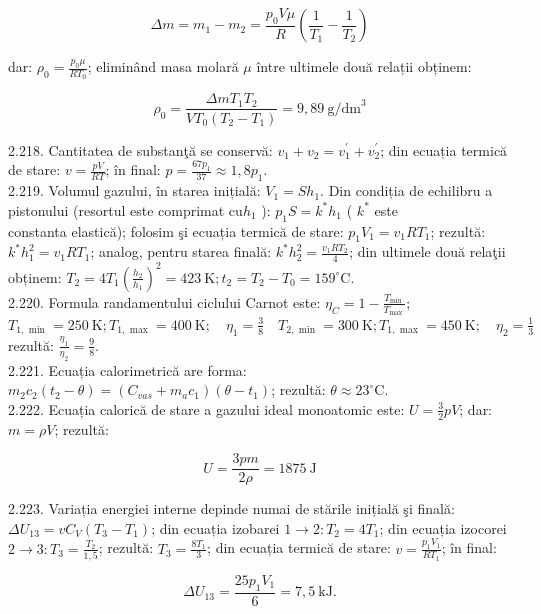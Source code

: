 \documentclass[10pt]{article}
\begin{document}
$$
\Delta m=m_{1}-m_{2}=\frac{p_{0} V \mu}{R}\left(\frac{1}{T_{1}}-\frac{1}{T_{2}}\right)
$$

dar: $\rho_{0}=\frac{p_{0} \mu}{R T_{0}}$; eliminând masa molară $\mu$ între ultimele două relații obținem:

$$
\rho_{0}=\frac{\Delta m T_{1} T_{2}}{V T_{0}\left(T_{2}-T_{1}\right)}=9,89 \mathrm{~g} / \mathrm{dm}^{3}
$$

2.218. Cantitatea de substanţă se conservă: $v_{1}+v_{2}=v_{1}^{\prime}+v_{2}^{\prime}$; din ecuația termică de stare: $v=\frac{p V}{R T}$; în final: $p=\frac{67 p_{1}}{37} \approx 1,8 p_{1}$.\\
2.219. Volumul gazului, în starea inițială: $V_{1}=S h_{1}$. Din condiția de echilibru a pistonului (resortul este comprimat $\mathrm{cu} h_{1}$ ): $p_{1} S=k^{*} h_{1}$ ( $k^{*}$ este\\
constanta elastică); folosim şi ecuația termică de stare: $p_{1} V_{1}=v_{1} R T_{1}$; rezultă: $k^{*} h_{1}^{2}=v_{1} R T_{1}$; analog, pentru starea finală: $k^{*} h_{2}^{2}=\frac{v_{1} R T_{2}}{4}$; din ultimele două relaţii obținem: $T_{2}=4 T_{1}\left(\frac{h_{2}}{h_{1}}\right)^{2}=423 \mathrm{~K} ; t_{2}=T_{2}-T_{0}=159^{\circ} \mathrm{C}$.\\
2.220. Formula randamentului ciclului Carnot este: $\eta_{C}=1-\frac{T_{\text {min }}}{T_{\text {max }}}$; $T_{1, \text { min }}=250 \mathrm{~K} ; T_{1, \text { max }}=400 \mathrm{~K} ; \quad \eta_{1}=\frac{3}{8} \quad T_{2, \text { min }}=300 \mathrm{~K} ; T_{1, \text { max }}=450 \mathrm{~K} ; \quad \eta_{2}=\frac{1}{3}$ rezultă: $\frac{\eta_{1}}{\eta_{2}}=\frac{9}{8}$.\\
2.221. Ecuația calorimetrică are forma: $m_{2} c_{2}\left(t_{2}-\theta\right)=\left(C_{v a s}+m_{a} c_{1}\right)\left(\theta-t_{1}\right)$; rezultă: $\theta \approx 23^{\circ} \mathrm{C}$.\\
2.222. Ecuația calorică de stare a gazului ideal monoatomic este: $U=\frac{3}{2} p V$; dar: $m=\rho V$; rezultă:

$$
U=\frac{3 p m}{2 \rho}=1875 \mathrm{~J}
$$

2.223. Variația energiei interne depinde numai de stările inițială şi finală: $\Delta U_{13}=v C_{V}\left(T_{3}-T_{1}\right)$; din ecuația izobarei $1 \rightarrow 2: T_{2}=4 T_{1}$; din ecuația izocorei $2 \rightarrow 3: T_{3}=\frac{T_{2}}{1,5}$; rezultă: $T_{3}=\frac{8 T_{1}}{3}$; din ecuația termică de stare: $v=\frac{p_{1} V_{1}}{R T_{1}}$; în final:

$$
\Delta U_{13}=\frac{25 p_{1} V_{1}}{6}=7,5 \mathrm{~kJ} .
$$
\end{document}
